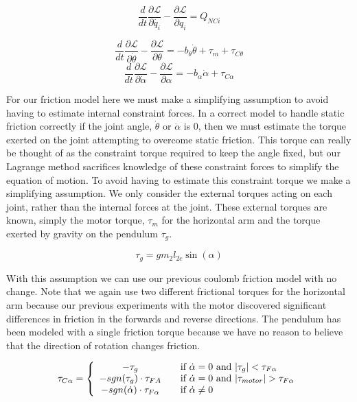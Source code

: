 \documentclass{article}
\theoremstyle{plain}
\theoremstyle{definition}
\theoremstyle{remark}
\newcommand{\Lagr}{\mathcal{L}}
\begin{document}
$$ \frac{d}{dt} \frac{\partial \Lagr}{\partial \dot{q_i}} - \frac{\partial \Lagr}{\partial q_i} = Q_{NCi} $$

$$ \frac{d}{dt} \frac{\partial \Lagr}{\partial \dot{\theta}} - \frac{\partial \Lagr}{\partial \theta} = -b_{\theta} \dot{\theta} + \tau_m + \tau_{C \theta}  $$
\begin{equation}
 \frac{d}{dt} \frac{\partial \Lagr}{\partial \dot{\alpha}} - \frac{\partial \Lagr}{\partial \alpha} = -b_{\alpha} \dot{\alpha} + \tau_{C \alpha} 
\end{equation}


For our friction model here we must make a simplifying assumption to avoid having to estimate internal constraint forces.  In a correct model to handle static friction correctly if the joint angle, $\dot{\theta}$ or $\dot{\alpha}$ is $0$, then we must estimate the torque exerted on the joint attempting to overcome static friction.  This torque can really be thought of as the constraint torque required to keep the angle fixed, but our Lagrange method sacrifices knowledge of these constraint forces to simplify the equation of motion.  To avoid having to estimate this constraint torque we make a simplifying assumption.  We only consider the external torques acting on each joint, rather than the internal forces at the joint.  These external torques are known, simply the motor torque, $\tau_m$ for the horizontal arm and the torque exerted by gravity on the pendulum $\tau_g$.

$$ \tau_g = g m_2 l_{2c} \sin(\alpha) $$  

With this assumption we can use our previous coulomb friction model with no change. Note that we again use two different frictional torques for the horizontal arm because our previous experiments with the motor discovered significant differences in friction in the forwards and reverse directions.  The pendulum has been modeled with a single friction torque because we have no reason to believe that the direction of rotation changes friction.  

\[
  \tau_{C \alpha} = \left\{
  \begin{array}{c l}
	 - \tau_{g} & \quad \text{if } \dot{\alpha} = 0 \text{ and } |\tau_{g}| < \tau_{F\alpha} \\
	- sgn(\tau_{g}) \cdot \tau_{FA} & \quad \text{if } \dot{\alpha} = 0 \text{ and } |\tau_{motor}| > \tau_{F\alpha} \\
	- sgn(\dot{\alpha}) \cdot \tau_{F\alpha} & \quad \text{if } \dot{\alpha} \neq 0 \\
  \end{array} \right.
\]
\end{document}
